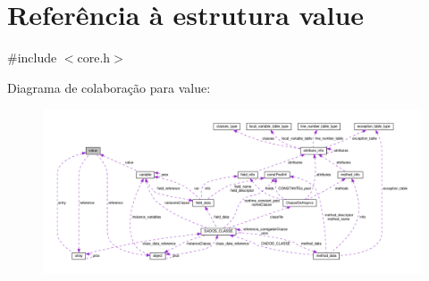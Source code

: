 \hypertarget{structvalue}{\section{Referência à estrutura value}
\label{structvalue}
}


{\ttfamily \#include $<$core.\-h$>$}



Diagrama de colaboração para value\-:\nopagebreak
\begin{figure}[H]
\begin{center}
\leavevmode
\includegraphics[width=350pt]{structvalue__coll__graph}
\end{center}
\end{figure}
